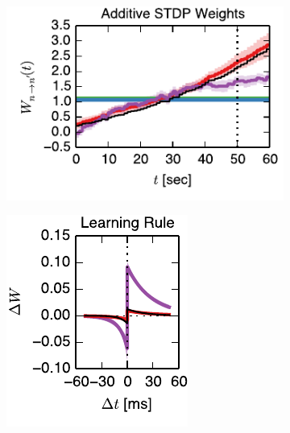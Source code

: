 \begin{figure}[t]
\begin{subfigure}[T]{1.45in}
    \label{fig:fig3_static_pred_ll}
  \end{subfigure} \\
  \vspace{-1.5em}
  \begin{subfigure}[T]{2.4in}
    \flushleft
    \includegraphics[width=\textwidth]{figures/ch4/fig3_add_nothr_trajectory}    
    \label{fig:fig3_add_nothr_trajectory}
  \end{subfigure}
  \begin{subfigure}[T]{1.45in}
    \includegraphics[width=\textwidth]{figures/ch4/fig3_add_nothr_stdp_rule}    

\end{subfigure}
\end{figure}

